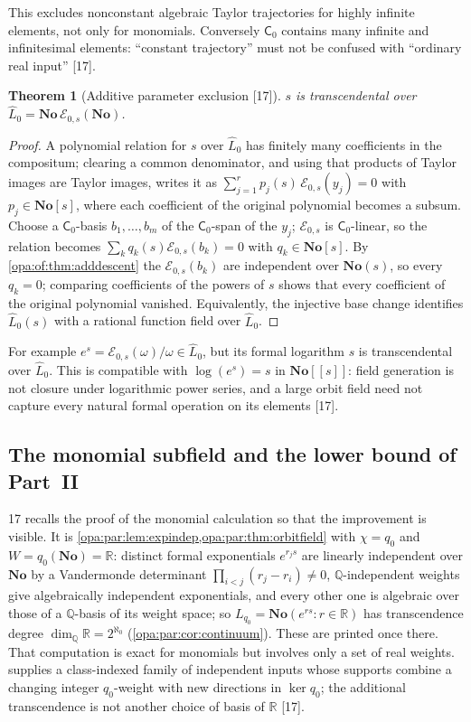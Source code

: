 \documentclass[11pt,oneside]{article}
\numberwithin{equation}{section}
\newtheorem{theorem}{Theorem}[section]
\theoremstyle{definition}
\theoremstyle{remark}
\newcommand{\No}{\mathbf{No}}
\newcommand{\R}{\mathbb R}
\newcommand{\Q}{\mathbb Q}
\newcommand{\EE}{\mathcal E}
\newcommand{\src}[1]{\textup{\textsf{\small[#1]}}}
\begin{document}
This excludes nonconstant algebraic Taylor trajectories for highly infinite elements, not only for monomials. Conversely
$\mathsf C_0$ contains many infinite and infinitesimal elements: ``constant trajectory'' must not be confused with ``ordinary
real input'' \src{17}.

\begin{theorem}[Additive parameter exclusion \src{17}]\label{opa:of:thm:parameter}
$s$ is transcendental over $\widehat L_0=\No\,\EE_{0,s}(\No)$.
\end{theorem}
\begin{proof}
A polynomial relation for $s$ over $\widehat L_0$ has finitely many coefficients in the compositum; clearing a common
denominator, and using that products of Taylor images are Taylor images, writes it as
$\sum_{j=1}^rp_j(s)\,\EE_{0,s}(y_j)=0$ with $p_j\in\No[s]$, where each coefficient of the original polynomial becomes a
subsum. Choose a $\mathsf C_0$-basis $b_1,\dots,b_m$ of the $\mathsf C_0$-span of the $y_j$; $\EE_{0,s}$ is $\mathsf C_0$-linear, so the
relation becomes $\sum_kq_k(s)\EE_{0,s}(b_k)=0$ with $q_k\in\No[s]$. By \cref{opa:of:thm:adddescent} the $\EE_{0,s}(b_k)$ are
independent over $\No(s)$, so every $q_k=0$; comparing coefficients of the powers of $s$ shows that every coefficient of the
original polynomial vanished. Equivalently, the injective base change identifies $\widehat L_0(s)$ with a rational function
field over $\widehat L_0$.
\end{proof}

For example $e^s=\EE_{0,s}(\omega)/\omega\in\widehat L_0$, but its formal logarithm $s$ is transcendental over $\widehat L_0$.
This is compatible with $\log(e^s)=s$ in $\No[[s]]$: field generation is not closure under logarithmic power series, and
a large orbit field need not capture every natural formal operation on its elements \src{17}.

\subsection{The monomial subfield and the lower bound of Part~II}\label{opa:of:sub:monomial}

17 recalls the proof of the monomial calculation so that the improvement is visible. It is
\cref{opa:par:lem:expindep,opa:par:thm:orbitfield} with $\chi=q_0$ and $W=q_0(\No)=\R$: distinct formal exponentials $e^{r_js}$
are linearly independent over $\No$ by a Vandermonde determinant $\prod_{i<j}(r_j-r_i)\ne0$, $\Q$-independent weights give
algebraically independent exponentials, and every other one is algebraic over those of a $\Q$-basis of its weight space; so
$L_{q_0}=\No(e^{rs}:r\in\R)$ has transcendence degree $\dim_\Q\R=2^{\aleph_0}$ (\cref{opa:par:cor:continuum}). These are printed
once there. That computation is exact for monomials but involves only a set of real weights. 
supplies a class-indexed family of independent inputs whose supports combine a changing integer $q_0$-weight with new
directions in $\ker q_0$; the additional transcendence is not another choice of basis of $\R$ \src{17}.
\end{document}
